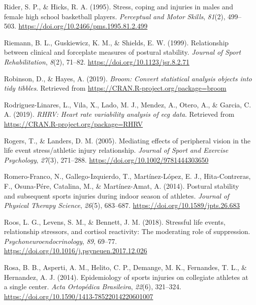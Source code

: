 \documentclass[
  english,
  man,floatsintext]{apa6}
\begin{document}
\leavevmode\hypertarget{ref-Rider1995}{}%
Rider, S. P., \& Hicks, R. A. (1995). Stress, coping and injuries in males and female high school basketball players. \emph{Perceptual and Motor Skills}, \emph{81}(2), 499--503. \url{https://doi.org/10.2466/pms.1995.81.2.499}

\leavevmode\hypertarget{ref-Riemann1999d}{}%
Riemann, B. L., Guskiewicz, K. M., \& Shields, E. W. (1999). Relationship between clinical and forceplate measures of postural stability. \emph{Journal of Sport Rehabilitation}, \emph{8}(2), 71--82. \url{https://doi.org/10.1123/jsr.8.2.71}

\leavevmode\hypertarget{ref-R-broom}{}%
Robinson, D., \& Hayes, A. (2019). \emph{Broom: Convert statistical analysis objects into tidy tibbles}. Retrieved from \url{https://CRAN.R-project.org/package=broom}

\leavevmode\hypertarget{ref-Rodriguez-Linares2017}{}%
Rodriguez-Linares, L., Vila, X., Lado, M. J., Mendez, A., Otero, A., \& Garcia, C. A. (2019). \emph{RHRV: Heart rate variability analysis of ecg data}. Retrieved from \url{https://CRAN.R-project.org/package=RHRV}

\leavevmode\hypertarget{ref-Rogers2005}{}%
Rogers, T., \& Landers, D. M. (2005). Mediating effects of peripheral vision in the life event stress/athletic injury relationship. \emph{Journal of Sport and Exercise Psychology}, \emph{27}(3), 271--288. \url{https://doi.org/10.1002/9781444303650}

\leavevmode\hypertarget{ref-Romero-Franco2014}{}%
Romero-Franco, N., Gallego-Izquierdo, T., Martínez-López, E. J., Hita-Contreras, F., Osuna-Pére, Catalina, M., \& Martínez-Amat, A. (2014). Postural stability and subsequent sports injuries during indoor season of athletes. \emph{Journal of Physical Therapy Science}, \emph{26}(5), 683--687. \url{https://doi.org/10.1589/jpts.26.683}

\leavevmode\hypertarget{ref-Roos2018}{}%
Roos, L. G., Levens, S. M., \& Bennett, J. M. (2018). Stressful life events, relationship stressors, and cortisol reactivity: The moderating role of suppression. \emph{Psychoneuroendocrinology}, \emph{89}, 69--77. \url{https://doi.org/10.1016/j.psyneuen.2017.12.026}

\leavevmode\hypertarget{ref-Rosa2014}{}%
Rosa, B. B., Asperti, A. M., Helito, C. P., Demange, M. K., Fernandes, T. L., \& Hernandez, A. J. (2014). Epidemiology of sports injuries on collegiate athletes at a single center. \emph{Acta Ortopédica Brasileira}, \emph{22}(6), 321--324. \url{https://doi.org/10.1590/1413-78522014220601007}
\end{document}
